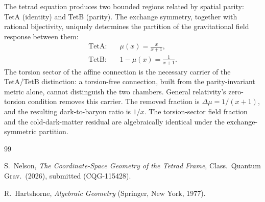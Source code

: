 \documentclass[twocolumn]{iopjournal}
\begin{document}
The tetrad equation produces two bounded regions related by
spatial parity: TetA (identity) and TetB (parity). The
exchange symmetry, together with rational bijectivity, uniquely
determines the partition of the gravitational field response
between them:
\begin{align}
  \text{TetA:} \quad & \mu(x) = \frac{x}{x + 1},
  \label{eq:sum_mu} \\[4pt]
  \text{TetB:} \quad & 1 - \mu(x) = \frac{1}{x + 1}.
  \label{eq:sum_tetb}
\end{align}
The torsion sector of the affine connection is the necessary
carrier of the TetA/TetB distinction: a torsion-free connection,
built from the parity-invariant metric alone, cannot distinguish
the two chambers. General relativity's zero-torsion condition
removes this carrier. The removed fraction is
$\Delta\mu = 1/(x+1)$, and the resulting dark-to-baryon
ratio is $1/x$. The torsion-sector field fraction and the
cold-dark-matter residual are algebraically identical under the
exchange-symmetric partition.


\begin{thebibliography}{99}

S.~Nelson,
\textit{The Coordinate-Space Geometry of the Tetrad Frame},
Class.\ Quantum Grav.\ (2026), submitted (CQG-115428).

R.~Hartshorne,
\textit{Algebraic Geometry}
(Springer, New York, 1977).

\end{thebibliography}
\end{document}
